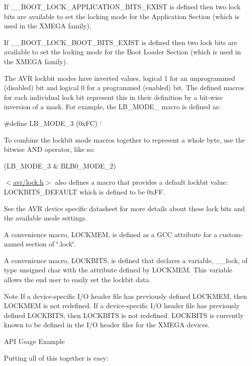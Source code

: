 If \+\_\+\+\_\+\+B\+O\+O\+T\+\_\+\+L\+O\+C\+K\+\_\+\+A\+P\+P\+L\+I\+C\+A\+T\+I\+O\+N\+\_\+\+B\+I\+T\+S\+\_\+\+E\+X\+I\+ST is defined then two lock bits are available to set the locking mode for the Application Section (which is used in the X\+M\+E\+GA family).

If \+\_\+\+\_\+\+B\+O\+O\+T\+\_\+\+L\+O\+C\+K\+\_\+\+B\+O\+O\+T\+\_\+\+B\+I\+T\+S\+\_\+\+E\+X\+I\+ST is defined then two lock bits are available to set the locking mode for the Boot Loader Section (which is used in the X\+M\+E\+GA family).

The A\+VR lockbit modes have inverted values, logical 1 for an unprogrammed (disabled) bit and logical 0 for a programmed (enabled) bit. The defined macros for each individual lock bit represent this in their definition by a bit-\/wise inversion of a mask. For example, the L\+B\+\_\+\+M\+O\+D\+E\+\_ macro is defined as\+: 
\begin{DoxyCode}
\textcolor{preprocessor}{    #define LB\_MODE\_3  (0xFC)}
\textcolor{preprocessor}{`   }
\end{DoxyCode}
 \begin{DoxyVerb}To combine the lockbit mode macros together to represent a whole byte,
use the bitwise AND operator, like so:
\end{DoxyVerb}
 
\begin{DoxyCode}
(LB\_MODE\_3 & BLB0\_MODE\_2)
\end{DoxyCode}


$<$\hyperlink{lock_8h}{avr/lock.\+h}$>$ also defines a macro that provides a default lockbit value\+: L\+O\+C\+K\+B\+I\+T\+S\+\_\+\+D\+E\+F\+A\+U\+LT which is defined to be 0x\+FF.

See the A\+VR device specific datasheet for more details about these lock bits and the available mode settings.

A convenience macro, L\+O\+C\+K\+M\+EM, is defined as a G\+CC attribute for a custom-\/named section of \char`\"{}.\+lock\char`\"{}.

A convenience macro, L\+O\+C\+K\+B\+I\+TS, is defined that declares a variable, \+\_\+\+\_\+lock, of type unsigned char with the attribute defined by L\+O\+C\+K\+M\+EM. This variable allows the end user to easily set the lockbit data.

\begin{DoxyNote}{Note}
If a device-\/specific I/O header file has previously defined L\+O\+C\+K\+M\+EM, then L\+O\+C\+K\+M\+EM is not redefined. If a device-\/specific I/O header file has previously defined L\+O\+C\+K\+B\+I\+TS, then L\+O\+C\+K\+B\+I\+TS is not redefined. L\+O\+C\+K\+B\+I\+TS is currently known to be defined in the I/O header files for the X\+M\+E\+GA devices.
\end{DoxyNote}
\begin{DoxyParagraph}{A\+PI Usage Example}

\end{DoxyParagraph}
Putting all of this together is easy\+:


